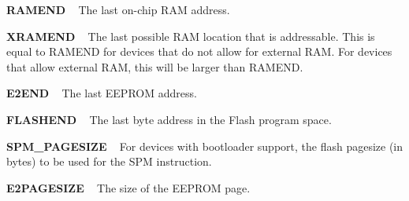 \begin{DoxyItemize}
\item {\bfseries R\+A\+M\+E\+ND} ~\newline
 The last on-\/chip R\+AM address. ~\newline

\item {\bfseries X\+R\+A\+M\+E\+ND} ~\newline
 The last possible R\+AM location that is addressable. This is equal to R\+A\+M\+E\+ND for devices that do not allow for external R\+AM. For devices that allow external R\+AM, this will be larger than R\+A\+M\+E\+ND. ~\newline

\item {\bfseries E2\+E\+ND} ~\newline
 The last E\+E\+P\+R\+OM address. ~\newline

\item {\bfseries F\+L\+A\+S\+H\+E\+ND} ~\newline
 The last byte address in the Flash program space. ~\newline

\item {\bfseries S\+P\+M\+\_\+\+P\+A\+G\+E\+S\+I\+ZE} ~\newline
 For devices with bootloader support, the flash pagesize (in bytes) to be used for the {\ttfamily S\+PM} instruction.
\item {\bfseries E2\+P\+A\+G\+E\+S\+I\+ZE} ~\newline
 The size of the E\+E\+P\+R\+OM page. 
\end{DoxyItemize}